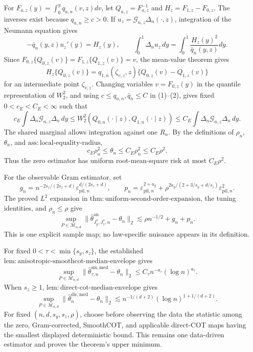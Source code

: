 For \(F_{a,z}(y)=\int_0^yq_{a,n}(v,z)dv\), let \(Q_{a,z}=F_{a,z}^{-1}\) and \(H_z=F_{1,z}-F_{0,z}\). The inverses exist because \(q_{a,n}\ge c>0\). If \(u_z=\mathcal G_{n,z}\Delta_n(\cdot,z)\), integration of the Neumann equation gives
\[
-\bar q_n(y,z)u_z'(y)=H_z(y),
\qquad
\int_0^1\Delta_nu_z\,dy=\int_0^1\frac{H_z(y)^2}{\bar q_n(y,z)}dy. \tag{1}
\]
Since \(F_{0,z}\{Q_{0,z}(v)\}=F_{1,z}\{Q_{1,z}(v)\}=v\), the mean-value theorem gives
\[
H_z\{Q_{0,z}(v)\}
=q_{1,n}(\zeta_{v,z},z)\{Q_{0,z}(v)-Q_{1,z}(v)\}                \tag{2}
\]
for an intermediate point \(\zeta_{v,z}\). Changing variables \(v=F_{0,z}(y)\) in the quantile representation of \(W_2^2\), and using \(c\le q_{a,n},\bar q_n\le C\) in (1)--(2), gives fixed \(0<c_E<C_E<\infty\) such that
\[
c_E\int\Delta_n\mathcal G_{n,z}\Delta_n\,dy
\le W_2^2(Q_{0,n}(\cdot\mid z),Q_{1,n}(\cdot\mid z))
\le C_E\int\Delta_n\mathcal G_{n,z}\Delta_n\,dy.              \tag{3}
\]
The shared marginal allows integration against one \(R_n\). By the definitions of \(\rho_n\), \(\theta_n\), and \(\mathrm{ass{:}local\text{-}equality\text{-}radius}\),
\[
c_E\rho_n^2\le\theta_n\le C_E\rho_n^2\le C_E\rho^2.           \tag{4}
\]
Thus the zero estimator has uniform root-mean-square risk at most \(C_E\rho^2\).

For the observable Gram estimator, set
\[
g_n=n^{-2s_z/(2s_z+d)}\varepsilon_{\mathrm{pil},n}^{d/(2s_z+d)},
\qquad
p_n=\varepsilon_{\mathrm{pil},n}^{2+a_y}
+\rho^{2a_y/(2+3/s_y+d/s_z)}\varepsilon_{\mathrm{pil},n}^2.
\]
The proved \(L^2\) expansion in \(\mathrm{thm{:}uniform\text{-}second\text{-}order\text{-}expansion}\), the tuning identities, and \(\rho_n\le\rho\) give
\[
\sup_{P\in\mathcal M_{n,d}}
\|\widehat\theta^{\mathrm{an}}_{J_y^*,J_z^*,n}-\theta_n\|_2
\lesssim\rho n^{-1/2}+g_n+p_n.                                 \tag{5}
\]
This is one explicit sample map; no law-specific nuisance appears in its definition.

For fixed \(0<\tau<\min\{s_y,s_z\}\), the established \(\mathrm{lem{:}anisotropic\text{-}smoothcot\text{-}median\text{-}envelope}\) gives
\[
\sup_{P\in\mathcal M_{n,d}}
\|\widehat\theta^{\mathrm{sm,med}}_{\tau,n}-\theta_n\|_2
\le C_\tau n^{-a_\tau}(\log n)^{a_\tau}.                       \tag{6}
\]
When \(s_z\ge1\), \(\mathrm{lem{:}direct\text{-}cot\text{-}median\text{-}envelope}\) gives
\[
\sup_{P\in\mathcal M_{n,d}}
\|\widehat\theta_n^{\mathrm{dir,med}}-\theta_n\|_2
\lesssim n^{-1/(d+2)}(\log n)^{1+1/(d+2)}.                      \tag{7}
\]
For fixed \((n,d,s_y,s_z,\rho)\), choose before observing the data the statistic among the zero, Gram-corrected, SmoothCOT, and applicable direct-COT maps having the smallest displayed deterministic bound. This remains one data-driven estimator and proves the theorem's upper minimum.

